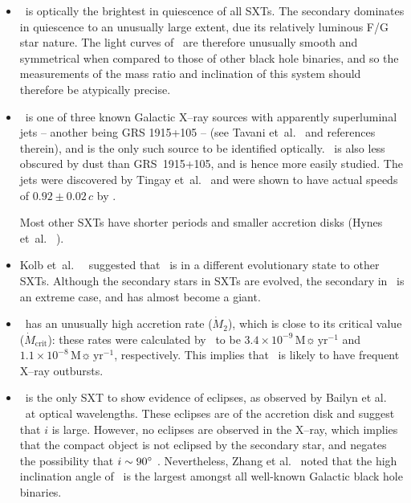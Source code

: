 \begin{itemize}

\item %
\groj\ is optically the brightest in quiescence of all SXTs. %
The secondary dominates in quiescence to an unusually large extent,
due its relatively luminous F/G star nature. 
The light curves of \groj\ are therefore unusually smooth and
symmetrical when compared to those of other black hole binaries, and
so the measurements of the mass ratio and inclination of this system
should therefore be atypically precise. %

\item 
\groj\ is one of three known Galactic X--ray sources with apparently superluminal
jets -- another being GRS 1915+105 -- (see Tavani et~al.\ %
and references therein), and is the only such source to be identified
optically. \groj\ is also less obscured by dust than \mbox{GRS 1915+105}, and is hence more easily studied. 
The jets were discovered by Tingay et~al.\ %
\citeyear{Tingay_et_al.:1995} %
and were shown to have actual speeds of $0.92 \pm 0.02\,c$ by %
. %

Most other SXTs have shorter periods and smaller accretion disks %
(Hynes et~al.\ %
).%

\item Kolb et~al.\ %
\citeyear{Kolb_et_al.:1997}%
\ suggested that \groj\ is in a different evolutionary state to other
SXTs. %
Although the secondary stars in SXTs are evolved, the secondary in
\groj\ is an extreme case, and has almost become a giant. %

\item
\groj\ has an unusually high accretion rate ($\dot{M}_{2}$), which
is close to its critical value ($\dot{M}_{\mathrm{crit}}$): these
rates were calculated by %
%
\ to be $3.4\times10^{-9}\,\mathrm{M}\sun\,\mathrm{yr}^{-1}$ and
$1.1\times10^{-8}\,\mathrm{M}\sun\,\mathrm{yr}^{-1}$,
respectively. This implies that \groj\ is likely to have frequent
X--ray outbursts. %



\item \groj\ is the only SXT to show evidence of eclipses, as observed by
Bailyn et al.\ %
\citeyear{BailynOroszGirad_et_al.:1995}%
\ at optical wavelengths. These eclipses are of the
accretion disk and suggest that $i$ is large. However, no eclipses are
observed in the X--ray, which implies that the compact object is not
eclipsed by the secondary star, and negates the possibility that
$i\sim90\hbox{$^\circ$}$ %
\cite{OroszBailyn:1997}%
. Nevertheless, Zhang et al.\ %
\citeyear{Zhang_et_al.:1997} %
noted that the high inclination angle of \groj\ is the largest amongst
all well-known Galactic black hole binaries. %


\end{itemize}
